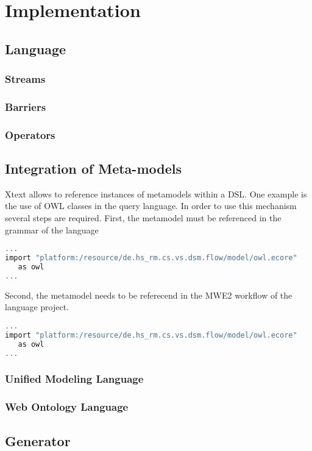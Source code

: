 \section{Implementation}
\subsection{Language}
\subsubsection{Streams}
\subsubsection{Barriers}
\subsubsection{Operators}
\subsection{Integration of Meta-models}
Xtext allows to reference instances of metamodels within a DSL. One example is 
the use of OWL classes in the query language. In order to use this mechanism 
several steps are required. First, the metamodel must be referenced in the 
grammar of the language
\begin{lstlisting}[language=C, caption={\emph{bla}},label={lst:shell}]
...
import "platform:/resource/de.hs_rm.cs.vs.dsm.flow/model/owl.ecore"
   as owl
...
\end{lstlisting}
Second, the metamodel needs to be referecend in the MWE2 workflow of the 
language project.
\begin{lstlisting}[language=C, caption={\emph{bla}},label={lst:shell}]
...
import "platform:/resource/de.hs_rm.cs.vs.dsm.flow/model/owl.ecore"
   as owl
...
\end{lstlisting}

\subsubsection{Unified Modeling Language}
\subsubsection{Web Ontology Language}
\subsection{Generator}
